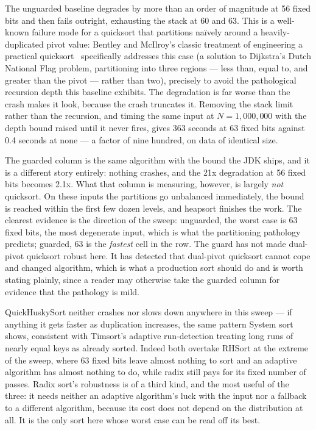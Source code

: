\documentclass[twoside,leqno,twocolumn]{article}
\begin{document}
The unguarded baseline degrades by more than an order of magnitude at 56 fixed bits and then fails
outright, exhausting the stack at 60 and 63.
This is a well-known failure mode for a quicksort that partitions naïvely around a heavily-duplicated pivot value:
Bentley and McIlroy's classic treatment of engineering a practical quicksort~\cite{10.1002/spe.4380231105}
specifically addresses this case (a solution to Dijkstra's Dutch National Flag problem, partitioning into three regions — less than, equal to,
and greater than the pivot — rather than two), precisely to avoid the pathological recursion depth this baseline exhibits.
The degradation is far worse than the crash makes it look, because the crash truncates it.
Removing the stack limit rather than the recursion, and timing the same input at $N=1{,}000{,}000$ with the
depth bound raised until it never fires, gives 363 seconds at 63 fixed bits against 0.4 seconds at none —
a factor of nine hundred, on data of identical size.

The guarded column is the same algorithm with the bound the JDK ships, and it is a different story
entirely: nothing crashes, and the 21x degradation at 56 fixed bits becomes 2.1x.
What that column is measuring, however, is largely \emph{not} quicksort.
On these inputs the partitions go unbalanced immediately, the bound is reached within the first few dozen
levels, and heapsort finishes the work.
The clearest evidence is the direction of the sweep: unguarded, the worst case is 63 fixed bits, the most
degenerate input, which is what the partitioning pathology predicts; guarded, 63 is the \emph{fastest}
cell in the row.
The guard has not made dual-pivot quicksort robust here.
It has detected that dual-pivot quicksort cannot cope and changed algorithm, which is what a
production sort should do and is worth stating plainly, since a reader may otherwise take the guarded
column for evidence that the pathology is mild.

QuickHuskySort neither crashes nor slows down anywhere in this sweep — if anything it gets faster as duplication increases,
the same pattern System sort shows,
consistent with Timsort's adaptive run-detection treating long runs of nearly equal keys as already sorted.
Indeed both overtake RHSort at the extreme of the sweep,
where 63 fixed bits leave almost nothing to sort and an adaptive algorithm has almost nothing to do,
while radix still pays for its fixed number of passes.
Radix sort's robustness is of a third kind, and the most useful of the three:
it needs neither an adaptive algorithm's luck with the input nor a fallback to a different algorithm,
because its cost does not depend on the distribution at all.
It is the only sort here whose worst case can be read off its best.
\end{document}
